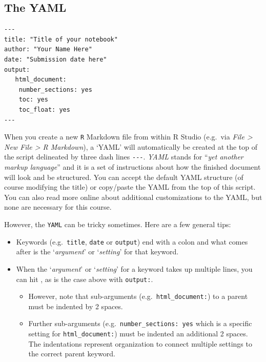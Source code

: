 \documentclass[
]{book}
\providecommand{\tightlist}{%
  \setlength{\itemsep}{0pt}\setlength{\parskip}{0pt}}
\begin{document}
\hypertarget{the-yaml}{%
\subsection{The YAML}\label{the-yaml}}

\begin{verbatim}
---
title: "Title of your notebook"
author: "Your Name Here"
date: "Submission date here"
output:
   html_document:
    number_sections: yes
    toc: yes
    toc_float: yes
---
\end{verbatim}

When you create a new \texttt{R} Markdown file from within R Studio (e.g.~via \emph{File \textgreater{} New File \textgreater{} R Markdown}), a `YAML' will automatically be created at the top of the script delineated by three dash lines \texttt{-\/-\/-}. \emph{YAML} stands for ``\emph{yet another markup language}'' and it is a set of instructions about how the finished document will look and be structured. You can accept the default YAML structure (of course modifying the title) or copy/paste the YAML from the top of this script. You can also read more online about additional customizations to the YAML, but none are necessary for this course.

However, the \texttt{YAML} can be tricky sometimes. Here are a few general tips:

\begin{itemize}
\tightlist
\item
  Keywords (e.g.~\texttt{title}, \texttt{date} or \texttt{output}) end with a colon and what comes after is the `\emph{argument}' or `\emph{setting}' for that keyword.\\
\item
  When the `\emph{argument}' or `\emph{setting}' for a keyword takes up multiple lines, you can hit , as is the case above with \texttt{output:}.

  \begin{itemize}
  \tightlist
  \item
    However, note that sub-arguments (e.g.~\texttt{html\_document:}) to a parent must be indented by 2 spaces.
  \item
    Further sub-arguments (e.g.~\texttt{number\_sections:\ yes} which is a specific setting for \texttt{html\_document:}) must be indented an additional 2 spaces. The indentations represent organization to connect multiple settings to the correct parent keyword.
  \end{itemize}
\end{itemize}
\end{document}

